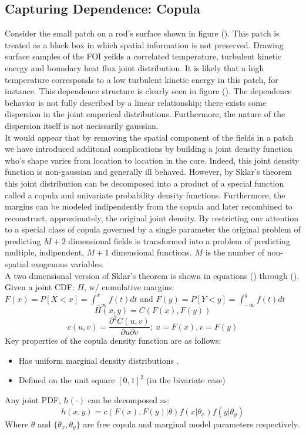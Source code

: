 \subsection{Capturing Dependence: Copula}

Consider the small patch on a rod's surface shown in figure ().  This patch is treated as a black box in which spatial information is not preserved. Drawing surface samples of the FOI yeilds a correlated temperature, turbulent kinetic energy and boundary heat flux joint distribution.  It is likely that a high temperature corresponds to a low turbulent kinetic energy in this patch, for instance.  This dependence structure is clearly seen in figure ().  The dependence behavior is not fully described by a linear relationship; there exists some dispersion in the joint emperical distributions.  Furthermore, the nature of the dispersion itself is not necissarily gaussian. \\

It would appear that by removing the spatial component of the fields in a patch we have introduced additonal complications by building a joint density function who's shape varies from location to location in the core.  Indeed, this joint density function is non-gaussian and generally ill behaved.  However, by Sklar's theorem this joint distribution can be decomposed into a product of a special function called a copula and univariate probability density functions.  Furthermore, the margins can be modeled indipendently from the copula and later recombined to reconstruct, approximately, the original joint density.  By restricting our attention to a special class of copula governed by a single parameter the original problem of predicting $M+2$ dimensional fields is transformed into a problem of predicting multiple, indipendent, $M+1$ dimensional functions.  $M$ is the number of non-spatial exogenous variables. \\

A two dimensional version of Sklar's theorem is shown in equations () through ().
Given a joint CDF: $H$, w/ cumulative margins: $F(x)=P[X < x] = \int_{-\infty}^{x}f(t)dt$
and $F(y)=P[Y < y] = \int_{-\infty}^{y}f(t)dt$
\begin{equation}
H(x,y) = C(F(x), F(y))
\end{equation}
\begin{equation}
c(u, v) = \frac{\partial^2 C(u, v)}{\partial u \partial v};\ u=F(x), v=F(y)
\end{equation}
Key properties of the copula density function are as follows:
\begin{itemize}
\item  Has uniform marginal density distributions \cite{Nelsen2006}.
\item  Defined on the unit square $[0, 1]^2$ (in the bivariate case)
\end{itemize}
Any joint PDF, $h(\cdot)$ can be decomposed as:
\begin{equation}
h(x, y) = c(F(x), F(y)|\theta)f(x|\theta_x)f(y|\theta_y)
\end{equation}
Where $\theta$ and $\{\theta_{x}, \theta_{y}\}$ are free copula and marginal model parameters respectively.

